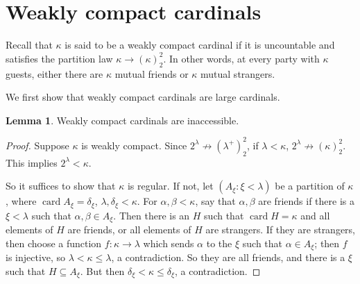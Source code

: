 \documentclass[12pt]{report}
\newcommand{\card}{\operatorname{card}}
\theoremstyle{definition}
\newtheorem{lemma}[theorem]{Lemma}
\begin{document}
\section{Weakly compact cardinals}
Recall that $\kappa$ is said to be a weakly compact cardinal if it is uncountable and satisfies the partition law $\kappa \to (\kappa)_2^2$.
In other words, at every party with $\kappa$ guests, either there are $\kappa$ mutual friends or $\kappa$ mutual strangers.

We first show that weakly compact cardinals are large cardinals.
\begin{lemma}
Weakly compact cardinals are inaccessible.
\end{lemma}
\begin{proof}
Suppose $\kappa$ is weakly compact. Since $2^\lambda \not \to (\lambda^+)^2_2$, if $\lambda < \kappa$, $2^\lambda \not \to (\kappa)^2_2$.
This implies $2^\lambda < \kappa$.

So it suffices to show that $\kappa$ is regular. If not, let $(A_\xi: \xi < \lambda)$ be a partition of $\kappa$, where $\card A_\xi = \delta_\xi$, $\lambda, \delta_\xi < \kappa$.
For $\alpha,\beta < \kappa$, say that $\alpha,\beta$ are friends if there is a $\xi < \lambda$ such that $\alpha,\beta \in A_\xi$.
Then there is an $H$ such that $\card H = \kappa$ and all elements of $H$ are friends, or all elements of $H$ are strangers.
If they are strangers, then choose a function $f: \kappa \to \lambda$ which sends $\alpha$ to the $\xi$ such that $\alpha \in A_\xi$; then $f$ is injective, so $\lambda < \kappa \leq \lambda$, a contradiction.
So they are all friends, and there is a $\xi$ such that $H \subseteq A_\xi$. But then $\delta_\xi < \kappa \leq \delta_\xi$, a contradiction.
\end{proof}
\end{document}
